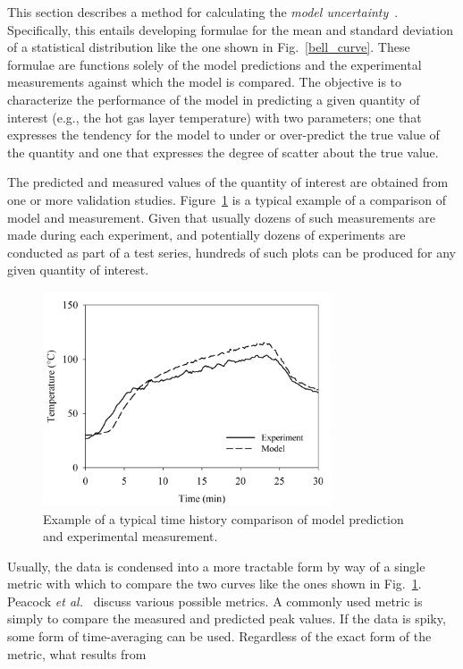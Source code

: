 This section describes a method for calculating the {\em model uncertainty}~\cite{McGrattan:Metrologia}. Specifically, this entails developing formulae for
the mean and standard deviation of a statistical distribution like the one shown in Fig.~\ref{bell_curve}. These formulae are functions
solely of the model predictions and the experimental measurements against which the model is compared. The objective is to
characterize the performance of the model in predicting a given quantity of interest (e.g., the hot gas layer temperature) with two
parameters; one that expresses the tendency for the model to under or over-predict the true value of the quantity and one that expresses the degree of scatter
about the true value.

The predicted and measured values of the quantity of interest are obtained from one or more validation studies.
Figure~\ref{temp_history} is a typical example of a comparison of model and measurement. Given that usually
dozens of such measurements are made during each experiment,
and potentially dozens of experiments are conducted as part of a test series, hundreds of such plots can be
produced for any given quantity of interest.
\begin{figure}[ht]
\begin{center}
\includegraphics[height=2.5in]{FIGURES/sample_time_history}
\end{center}
\caption[Sample time history plots.]{Example of a typical time history comparison of model prediction and experimental measurement.}
\label{temp_history}
\end{figure}
Usually, the data is condensed into a more tractable form by way of a single metric with which to
compare the two curves like the ones shown in Fig.~\ref{temp_history}. Peacock {\em et al.}~\cite{Peacock:FSJ1999}
discuss various possible metrics. A commonly used metric is simply to compare the measured and predicted peak values.
If the data is spiky, some form of time-averaging can be used. Regardless of the exact form of the metric, what results from
